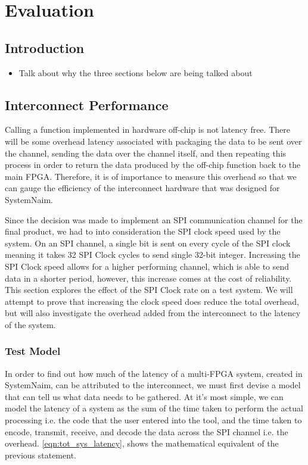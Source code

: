 \chapter{Evaluation}

\section{Introduction}

\begin{itemize}
    \item Talk about why the three sections below are being talked about
\end{itemize}


\section{Interconnect Performance}
\label{sec:interconnect}

Calling a function implemented in hardware off-chip is not latency free. There will be some overhead latency associated with packaging the data to be sent over the channel, sending the data over the channel itself, and then repeating this process in order to return the data produced by the off-chip function back to the main FPGA. Therefore, it is of importance to measure this overhead so that we can gauge the efficiency of the interconnect hardware that was designed for SystemNaim.

Since the decision was made to implement an SPI communication channel for the final product, we had to into consideration the SPI clock speed used by the system. On an SPI channel, a single bit is sent on every cycle of the SPI clock meaning it takes 32 SPI Clock cycles to send single 32-bit integer. Increasing the SPI Clock speed allows for a higher performing channel, which is able to send data in a shorter period, however, this increase comes at the cost of reliability. This section explores the effect of the SPI Clock rate on a test system. We will attempt to prove that increasing the clock speed does reduce the total overhead, but will also investigate the overhead added from the interconnect to the latency of the system.

\subsection{Test Model}

In order to find out how much of the latency of a multi-FPGA system, created in SystemNaim, can be attributed to the interconnect, we must first devise a model that can tell us what data needs to be gathered. At it's most simple, we can model the latency of a system as the sum of the time taken to perform the actual processing i.e. the code that the user entered into the tool, and the time taken to encode, transmit, receive, and decode the data across the SPI channel i.e. the overhead. \autoref{eqn:tot_sys_latency}, shows the mathematical equivalent of the previous statement.

